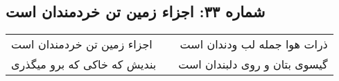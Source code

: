 \begin{center}
\section*{شماره ۳۳: اجزاء زمین تن خردمندان است}
\label{sec:033}
\begin{longtable}{l p{0.5cm} r}
اجزاء زمین تن خردمندان است
&&
ذرات هوا جمله لب ودندان است
\\
بندیش که خاکی که برو میگذری
&&
گیسوی بتان و روی دلبندان است
\\
\end{longtable}
\end{center}
